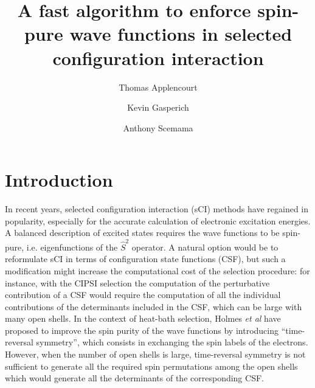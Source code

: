 \documentclass[aip,jcp,reprint,showkeys]{revtex4-1}
\newcommand{\stwo}{\hat{S}^2}
\begin{document}
\title{A fast algorithm to enforce spin-pure wave functions in selected configuration interaction}

\author{Thomas Applencourt}
\author{Kevin Gasperich}
\author{Anthony Scemama}

\begin{abstract}
\end{abstract}


\maketitle

\section{Introduction}

In recent years, selected configuration interaction (sCI) methods have regained in
popularity,\cite{Greer_1998,Stampfuss_2005,Bytautas_2009,Booth_2009,Giner_2013,Buenker_2014,Holmes_2016,Ohtsuka_2017,Coe_2018}
especially for the accurate calculation of electronic excitation
energies.\cite{Coe_2013,Schriber_2017,Holmes_2017,Loos_2018,Scemama_2018,Dash_2018}
A balanced description of excited states requires the wave functions to be
spin-pure, i.e. eigenfunctions of the $\stwo$ operator.
A natural option would be to reformulate sCI in terms of configuration state
functions (CSF), but such a modification might increase the computational cost
of the selection procedure: for instance, with the CIPSI
selection\cite{Bender_1969,Whitten_1969,Huron_1973} the computation of the
perturbative contribution of a CSF would require the computation of all the
individual contributions of the determinants included in the CSF, which can
be large with many open shells.
In the context of heat-bath selection, Holmes \textit{et al} have proposed to
improve the spin purity of the wave functions by introducing ``time-reversal
symmetry''\cite{Holmes_2017}, which consists in exchanging the spin labels of
the electrons.
However, when the number of open shells is large, time-reversal symmetry is not
sufficient to generate all the required spin permutations among the open shells
which would generate all the determinants of the corresponding CSF.
\end{document}
